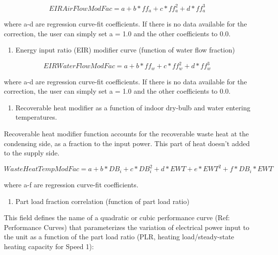 \begin{equation}
EIRAirFlowModFac = a + b*f{f_a} + c*ff_a^2 + d*ff_a^3
\end{equation}

where a-d are regression curve-fit coefficients.  If there is no data available for the correction, the user can simply set a = 1.0 and the other coefficients to 0.0.

\begin{enumerate}
\def\labelenumi{\arabic{enumi})}
\setcounter{enumi}{5}
\tightlist
\item
  Energy input ratio (EIR) modifier curve (function of water flow fraction)
\end{enumerate}

\begin{equation}
EIRWaterFlowModFac = a + b*f{f_w} + c*ff_w^2 + d*ff_w^3
\end{equation}

where a-d are regression curve-fit coefficients.  If there is no data available for the correction, the user can simply set a = 1.0 and the other coefficients to 0.0.

\begin{enumerate}
\def\labelenumi{\arabic{enumi})}
\setcounter{enumi}{6}
\tightlist
\item
  Recoverable heat modifier as a function of indoor dry-bulb and water entering temperatures.
\end{enumerate}

Recoverable heat modifier function accounts for the recoverable waste heat at the condensing side, as a fraction to the input power. This part of heat doesn't added to the supply side.

\begin{equation}
WasteHeatTempModFac = a + b*D{B_i} + c*DB_i^2 + d*EWT + e*EW{T^2} + f*D{B_i}*EWT
\end{equation}

where a-f are regression curve-fit coefficients.

\begin{enumerate}
\def\labelenumi{\arabic{enumi})}
\setcounter{enumi}{7}
\tightlist
\item
  Part load fraction correlation (function of part load ratio)
\end{enumerate}

This field defines the name of a quadratic or cubic performance curve (Ref: Performance Curves) that parameterizes the variation of electrical power input to the unit as a function of the part load ratio (PLR, heating load/steady-state heating capacity for Speed 1):

